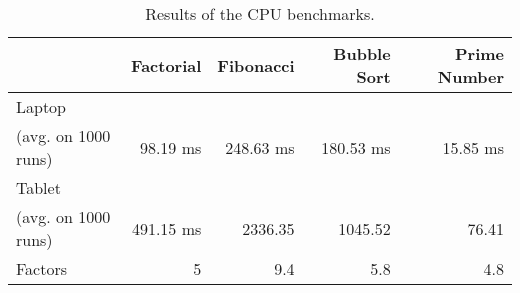 \begin {table}[htpb] 
  \centering
\begin {tabular} {|l|r|r|r|r|}
	\hline
		&Factorial&Fibonacci&Bubble Sort&Prime Number\\
	\hline
	Laptop&&&&\\
	(avg. on 1000 runs)&98.19 ms&248.63 ms&180.53 ms&15.85 ms\\
	\hline
	Tablet&&&&\\
	(avg. on 1000 runs)&491.15 ms&2336.35&1045.52&76.41\\
	\hline
	\hline
	Factors&5&9.4&5.8&4.8\\
	\hline
\end {tabular}
\caption {Results of the CPU benchmarks.}
\label {tab:cpu-results}
\end {table}

